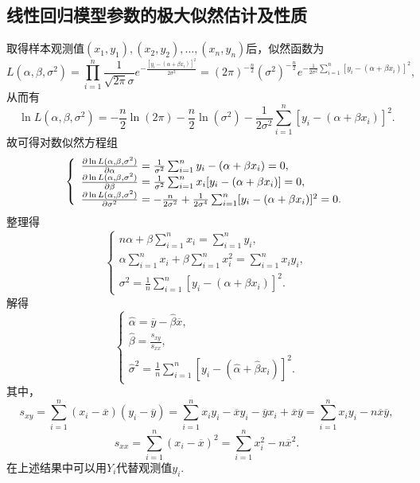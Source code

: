 \subsection{线性回归模型参数的极大似然估计及性质}
取得样本观测值\((x_1,y_1),(x_2,y_2),\dotsc,(x_n,y_n)\)后，似然函数为\begin{equation*}
L(\alpha,\beta,\sigma^2)
= \prod_{i=1}^n{ \frac{1}{\sqrt{2\pi}\sigma} e^{ -\frac{[y_i - (\alpha+\beta x_i)]^2}{2\sigma^2} } }
= (2\pi)^{-\frac{n}{2}} (\sigma^2)^{-\frac{n}{2}} e^{ -\frac{1}{2\sigma^2} \sum_{i=1}^n[y_i - (\alpha+\beta x_i)]^2 },
\end{equation*}从而有\begin{equation*}
\ln L(\alpha,\beta,\sigma^2)
= -\frac{n}{2} \ln(2\pi) - \frac{n}{2} \ln(\sigma^2) - \frac{1}{2\sigma^2} \sum_{i=1}^n[y_i-(\alpha+\beta x_i)]^2.
\end{equation*}故可得对数似然方程组\begin{equation*}
\left\{ \begin{array}{l}
\pdv{\ln L(\alpha,\beta,\sigma^2)}{\alpha}
= \frac{1}{\sigma^2} \sum_{i=1}^n{y_i-(\alpha+\beta x_i)} = 0, \\
\pdv{\ln L(\alpha,\beta,\sigma^2)}{\beta}
= \frac{1}{\sigma^2} \sum_{i=1}^n{x_i[y_i-(\alpha+\beta x_i)]} = 0, \\
\pdv{\ln L(\alpha,\beta,\sigma^2)}{\sigma^2}
= -\frac{n}{2\sigma^2} + \frac{1}{2\sigma^4} \sum_{i=1}^n[y_i-(\alpha+\beta x_i)]^2 = 0.
\end{array} \right.
\end{equation*}整理得\begin{equation*}
\left\{ \begin{array}{l}
n \alpha + \beta \sum_{i=1}^n{x_i} = \sum_{i=1}^n{y_i}, \\
\alpha \sum_{i=1}^n{x_i} + \beta \sum_{i=1}^n{x_i^2} = \sum_{i=1}^n{x_i y_i}, \\
\sigma^2 = \frac{1}{n} \sum_{i=1}^n[y_i - (\alpha+\beta x_i)]^2.
\end{array} \right.
\end{equation*}解得\begin{equation*}
\left\{ \begin{array}{l}
\hat{\alpha} = \overline{y} - \hat{\beta} \overline{x}, \\
\hat{\beta} = \frac{s_{xy}}{s_{xx}}, \\
\hat{\sigma}^2 = \frac{1}{n} \sum_{i=1}^n[y_i - (\hat{\alpha}+\hat{\beta}x_i)]^2.
\end{array} \right.
\end{equation*}其中，\begin{equation*}
s_{xy} = \sum_{i=1}^n(x_i-\overline{x})(y_i-\overline{y})
= \sum_{i=1}^n{x_i y_i - \overline{x}y_i - \overline{y}x_i + \overline{x}\overline{y}}
= \sum_{i=1}^n{x_i y_i - n \overline{x} \overline{y}},
\end{equation*}\begin{equation*}
s_{xx} = \sum_{i=1}^n(x_i - \overline{x})^2
= \sum_{i=1}^n{x_i^2 - n \overline{x}^2}.
\end{equation*}
在上述结果中可以用\(Y_i\)代替观测值\(y_i\).

